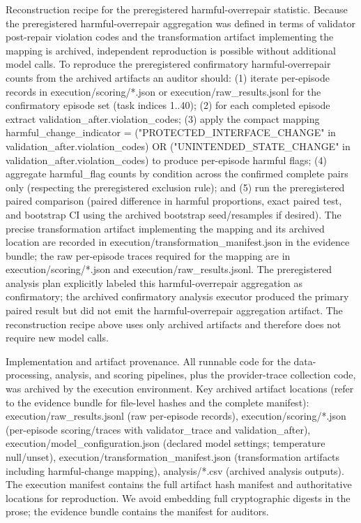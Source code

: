 \documentclass[conference]{IEEEtran}
\begin{document}
Reconstruction recipe for the preregistered harmful-overrepair statistic. Because the preregistered harmful-overrepair aggregation was defined in terms of validator post-repair violation codes and the transformation artifact implementing the mapping is archived, independent reproduction is possible without additional model calls. To reproduce the preregistered confirmatory harmful-overrepair counts from the archived artifacts an auditor should: (1) iterate per-episode records in execution/scoring/*.json or execution/raw\_results.jsonl for the confirmatory episode set (task indices 1..40); (2) for each completed episode extract validation\_after.violation\_codes; (3) apply the compact mapping harmful\_change\_indicator = ("PROTECTED\_INTERFACE\_CHANGE" in validation\_after.violation\_codes) OR ("UNINTENDED\_STATE\_CHANGE" in validation\_after.violation\_codes) to produce per-episode harmful flags; (4) aggregate harmful\_flag counts by condition across the confirmed complete pairs only (respecting the preregistered exclusion rule); and (5) run the preregistered paired comparison (paired difference in harmful proportions, exact paired test, and bootstrap CI using the archived bootstrap seed/resamples if desired). The precise transformation artifact implementing the mapping and its archived location are recorded in execution/transformation\_manifest.json in the evidence bundle; the raw per-episode traces required for the mapping are in execution/scoring/*.json and execution/raw\_results.jsonl. The preregistered analysis plan explicitly labeled this harmful-overrepair aggregation as confirmatory; the archived confirmatory analysis executor produced the primary paired result but did not emit the harmful-overrepair aggregation artifact. The reconstruction recipe above uses only archived artifacts and therefore does not require new model calls.

Implementation and artifact provenance. All runnable code for the data-processing, analysis, and scoring pipelines, plus the provider-trace collection code, was archived by the execution environment. Key archived artifact locations (refer to the evidence bundle for file-level hashes and the complete manifest): execution/raw\_results.jsonl (raw per-episode records), execution/scoring/*.json (per-episode scoring/traces with validator\_trace and validation\_after), execution/model\_configuration.json (declared model settings; temperature null/unset), execution/transformation\_manifest.json (transformation artifacts including harmful-change mapping), analysis/*.csv (archived analysis outputs). The execution manifest contains the full artifact hash manifest and authoritative locations for reproduction. We avoid embedding full cryptographic digests in the prose; the evidence bundle contains the manifest for auditors.
\end{document}
